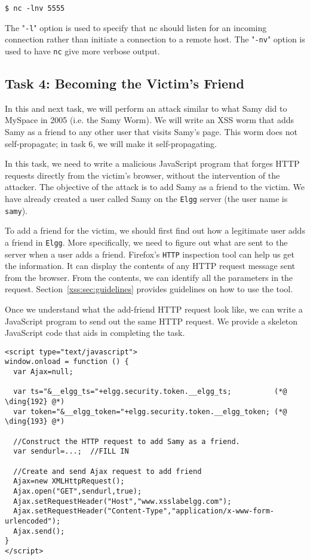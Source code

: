 \begin{lstlisting}
$ nc -lnv 5555 
\end{lstlisting}

\noindent The "{\tt -l}" option is used to specify that nc should listen for an incoming
connection rather than initiate a connection to a remote host. The "{\tt -nv}" option is used to
have \texttt{nc} give more verbose output.


\subsection{Task 4: Becoming the Victim's Friend}

In this and next task, we will perform an attack similar to what Samy did to MySpace in 2005
(i.e. the Samy Worm). We will write an XSS worm that adds Samy as a friend to any other user
that visits Samy's page. This worm does not self-propagate; in  task 6, we will make it
self-propagating.

In this task, we need to write a malicious JavaScript program that forges HTTP requests
directly from the victim's browser, without the intervention of the attacker.  The objective of
the attack is to add Samy as a friend to the victim. We have already created a user called Samy
on the {\tt Elgg} server (the user name is {\tt samy}).


To add a friend for the victim, we should first find out how a legitimate 
user adds a friend in {\tt Elgg}.
More specifically, we need to figure out what are sent to the server when a user 
adds a friend. Firefox's \texttt{HTTP} inspection tool 
can help us get the information. It can display the contents of any HTTP request message sent 
from the browser.  From the contents, we can identify all
the parameters in the request. Section~\ref{xss:sec:guidelines}
provides guidelines on how to use the tool.


Once we understand what the add-friend HTTP request look like, 
we can write a JavaScript program to send out the same HTTP request. We provide a skeleton
JavaScript code that aids in completing the task.

\begin{lstlisting}
<script type="text/javascript">
window.onload = function () {
  var Ajax=null;

  var ts="&__elgg_ts="+elgg.security.token.__elgg_ts;          (*@ \ding{192} @*)
  var token="&__elgg_token="+elgg.security.token.__elgg_token; (*@ \ding{193} @*)

  //Construct the HTTP request to add Samy as a friend.
  var sendurl=...;  //FILL IN

  //Create and send Ajax request to add friend
  Ajax=new XMLHttpRequest();
  Ajax.open("GET",sendurl,true);
  Ajax.setRequestHeader("Host","www.xsslabelgg.com");
  Ajax.setRequestHeader("Content-Type","application/x-www-form-urlencoded");
  Ajax.send();
} 
</script>
\end{lstlisting}


